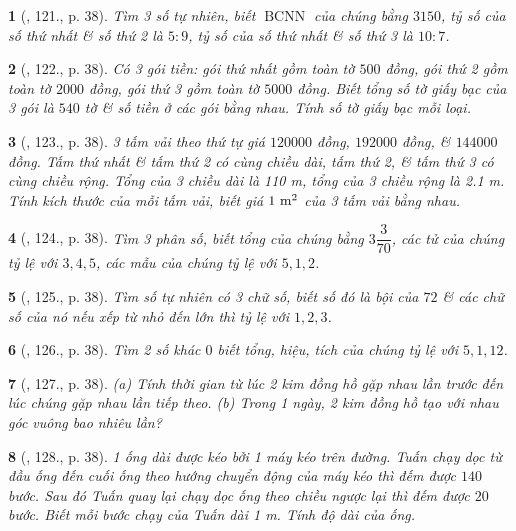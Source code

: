 \documentclass{article}
\newtheorem{baitoan}{}
\begin{document}
\begin{baitoan}[\cite{Binh_Toan_7_tap_1}, 121., p. 38]
	Tìm 3 số tự nhiên, biết $\operatorname{BCNN}$ của chúng bằng $3150$, tỷ số của số thứ nhất \& số thứ 2 là $5:9$, tỷ số của số thứ nhất \& số thứ 3 là $10:7$.
\end{baitoan}

\begin{baitoan}[\cite{Binh_Toan_7_tap_1}, 122., p. 38]
	Có 3 gói tiền: gói thứ nhất gồm toàn tờ $500$ đồng, gói thứ 2 gồm toàn tờ $2000$ đồng, gói thứ 3 gồm toàn tờ $5000$ đồng. Biết tổng số tờ giấy bạc của 3 gói là $540$ tờ \& số tiền ở các gói bằng nhau. Tính số tờ giấy bạc mỗi loại.
\end{baitoan}

\begin{baitoan}[\cite{Binh_Toan_7_tap_1}, 123., p. 38]
	3 tấm vải theo thứ tự giá $120000$ đồng, $192000$ đồng, \& $144000$ đồng. Tấm thứ nhất \& tấm thứ 2 có cùng chiều dài, tấm thứ 2, \& tấm thứ 3 có cùng chiều rộng. Tổng của 3 chiều dài là {\rm110 m}, tổng của 3 chiều rộng là {\rm2.1 m}. Tính kích thước của mỗi tấm vải, biết giá $\rm1\ m^2$ của 3 tấm vải bằng nhau.
\end{baitoan}

\begin{baitoan}[\cite{Binh_Toan_7_tap_1}, 124., p. 38]
	Tìm 3 phân số, biết tổng của chúng bằng $3\dfrac{3}{70}$, các tử của chúng tỷ lệ với $3,4,5$, các mẫu của chúng tỷ lệ với $5,1,2$.
\end{baitoan}

\begin{baitoan}[\cite{Binh_Toan_7_tap_1}, 125., p. 38]
	Tìm số tự nhiên có 3 chữ số, biết số đó là bội của $72$ \& các chữ số của nó nếu xếp từ nhỏ đến lớn thì tỷ lệ với $1,2,3$.
\end{baitoan}

\begin{baitoan}[\cite{Binh_Toan_7_tap_1}, 126., p. 38]
	Tìm 2 số khác $0$ biết tổng, hiệu, tích của chúng tỷ lệ với $5,1,12$.
\end{baitoan}

\begin{baitoan}[\cite{Binh_Toan_7_tap_1}, 127., p. 38]
	(a) Tính thời gian từ lúc 2 kim đồng hồ gặp nhau lần trước đến lúc chúng gặp nhau lần tiếp theo. (b) Trong 1 ngày, 2 kim đồng hồ tạo với nhau góc vuông bao nhiêu lần?	
\end{baitoan}

\begin{baitoan}[\cite{Binh_Toan_7_tap_1}, 128., p. 38]
	1 ống dài được kéo bởi 1 máy kéo trên đường. Tuấn chạy dọc từ đầu ống đến cuối ống theo hướng chuyển động của máy kéo thì đếm được $140$ bước. Sau đó Tuấn quay lại chạy dọc ống theo chiều ngược lại thì đếm được $20$ bước. Biết mỗi bước chạy của Tuấn dài {\rm1 m}. Tính độ dài của ống.
\end{baitoan}
\end{document}
